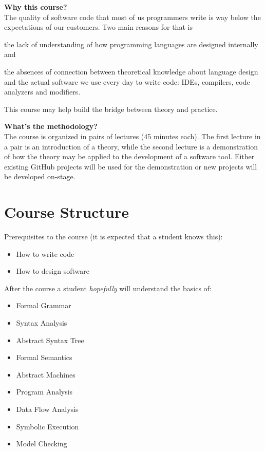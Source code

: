 \documentclass[nobrand,anonymous,nodate,nosecurity]{huawei}
\begin{document}
\textbf{Why this course?}\\
The quality of software code that most of us programmers write is way below
the expectations of our customers. Two main reasons for that
is \begin{inparaenum}[a)]
\item the lack of understanding of how programming languages are designed
internally and
\item the absences of connection between theoretical knowledge
about language design and the actual software we use every day to
write code: IDEs, compilers, code analyzers and modifiers.\end{inparaenum}
This course may help build the bridge between theory and practice.

\textbf{What's the methodology?}\\
The course is organized in pairs of lectures (45 minutes each). The first lecture in a pair
is an introduction of a theory, while the second lecture is a demonstration
of how the theory may be applied to the development of a software tool.
Either existing GitHub projects will be used for the demonstration
or new projects will be developed on-stage.

\newpage
\section*{Course Structure}

Prerequisites to the course (it is expected that a student knows this):

\begin{itemize}
\item How to write code
\item How to design software
\end{itemize}

After the course a student \emph{hopefully} will understand the basics of:

\begin{itemize}
\item Formal Grammar
\item Syntax Analysis
\item Abstract Syntax Tree
\item Formal Semantics
\item Abstract Machines
\item Program Analysis
\item Data Flow Analysis
\item Symbolic Execution
\item Model Checking
\end{itemize}
\end{document}
